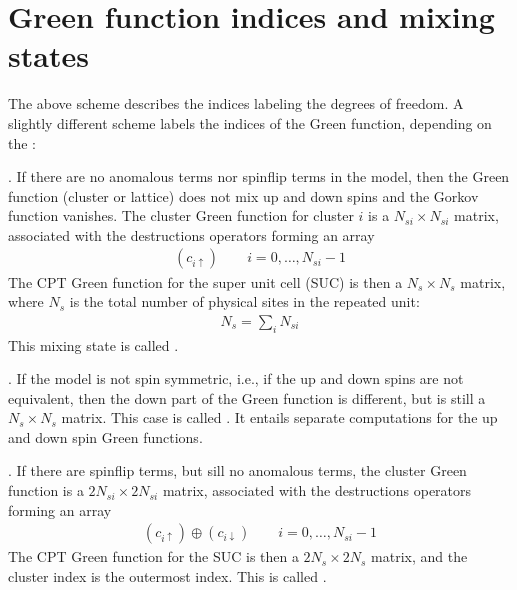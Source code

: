 \documentclass[letterpaper,10pt,english]{sphinxmanual}
\begin{document}
\section{Green function indices and mixing states}
\label{\detokenize{models:green-function-indices-and-mixing-states}}
\sphinxAtStartPar
The above scheme describes the indices labeling the degrees of freedom.
A slightly different scheme labels the indices of the Green function, depending on the :

\sphinxAtStartPar
{}. If there are no anomalous terms nor spin\sphinxhyphen{}flip terms in the model, then the Green function (cluster or lattice) does not mix up and down spins and the Gorkov function vanishes. The cluster Green function for cluster \(i\) is a \(N_{si}\times N_{si}\) matrix, associated with the destructions operators forming an array
\begin{equation*}
\begin{split}(c_{i\uparrow}) \qquad i=0,\dots,N_{si}-1\end{split}
\end{equation*}
\sphinxAtStartPar
The CPT Green function for the super unit cell (SUC) is then a \(N_s\times N_s\) matrix, where \(N_s\) is the total number of physical sites in the repeated unit:
\begin{equation*}
\begin{split}N_s = \sum_{i} N_{si}\end{split}
\end{equation*}
\sphinxAtStartPar
This mixing state is called .

\sphinxAtStartPar
{}. If the model is not spin symmetric, i.e., if the up and down spins are not equivalent, then the down part of the Green function is different, but is still a \(N_s\times N_s\) matrix. This case is called .
It entails separate computations for the up and down spin Green functions.

\sphinxAtStartPar
{}. If there are spin\sphinxhyphen{}flip terms, but sill no anomalous terms, the cluster Green function is a \(2N_{si}\times 2N_{si}\) matrix, associated with the destructions operators forming an array
\begin{equation*}
\begin{split}(c_{i\uparrow})\oplus(c_{i\downarrow}) \qquad i=0,\dots,N_{si}-1\end{split}
\end{equation*}
\sphinxAtStartPar
The CPT Green function for the SUC is then a \(2N_s\times 2N_s\) matrix, and the cluster index is the outermost index. This is called .
\end{document}
